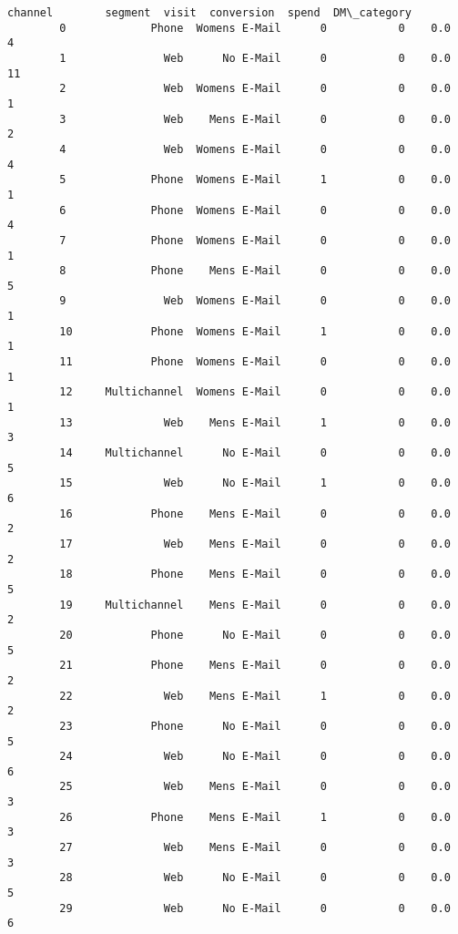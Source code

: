 \documentclass[11pt]{article}
\begin{document}
\begin{Verbatim}[commandchars=\\\{\}]
                    channel        segment  visit  conversion  spend  DM\_category  
        0             Phone  Womens E-Mail      0           0    0.0            4  
        1               Web      No E-Mail      0           0    0.0           11  
        2               Web  Womens E-Mail      0           0    0.0            1  
        3               Web    Mens E-Mail      0           0    0.0            2  
        4               Web  Womens E-Mail      0           0    0.0            4  
        5             Phone  Womens E-Mail      1           0    0.0            1  
        6             Phone  Womens E-Mail      0           0    0.0            4  
        7             Phone  Womens E-Mail      0           0    0.0            1  
        8             Phone    Mens E-Mail      0           0    0.0            5  
        9               Web  Womens E-Mail      0           0    0.0            1  
        10            Phone  Womens E-Mail      1           0    0.0            1  
        11            Phone  Womens E-Mail      0           0    0.0            1  
        12     Multichannel  Womens E-Mail      0           0    0.0            1  
        13              Web    Mens E-Mail      1           0    0.0            3  
        14     Multichannel      No E-Mail      0           0    0.0            5  
        15              Web      No E-Mail      1           0    0.0            6  
        16            Phone    Mens E-Mail      0           0    0.0            2  
        17              Web    Mens E-Mail      0           0    0.0            2  
        18            Phone    Mens E-Mail      0           0    0.0            5  
        19     Multichannel    Mens E-Mail      0           0    0.0            2  
        20            Phone      No E-Mail      0           0    0.0            5  
        21            Phone    Mens E-Mail      0           0    0.0            2  
        22              Web    Mens E-Mail      1           0    0.0            2  
        23            Phone      No E-Mail      0           0    0.0            5  
        24              Web      No E-Mail      0           0    0.0            6  
        25              Web    Mens E-Mail      0           0    0.0            3  
        26            Phone    Mens E-Mail      1           0    0.0            3  
        27              Web    Mens E-Mail      0           0    0.0            3  
        28              Web      No E-Mail      0           0    0.0            5  
        29              Web      No E-Mail      0           0    0.0            6  

\end{Verbatim}
\end{document}
